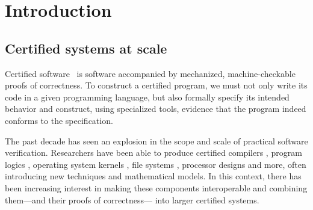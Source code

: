 \documentclass[draft,11pt]{report}
\begin{document}
\begin{abstract}



\end{abstract}

\tableofcontents

\chapter{Introduction} %

\section{Certified systems at scale} %
\label{ssec:certsys}


Certified software~\citep{shao10}
is software accompanied by
mechanized, machine-checkable proofs of correctness.
To construct a certified program,
we must not only write its code in a given programming language,
but also formally specify its intended behavior
and construct, using specialized tools,
evidence that the program
indeed conforms to the specification.


The past decade has seen an explosion
in the scope and scale of practical software verification.
Researchers have been able to produce certified
compilers \citep{compcert},
program logics \citep{vst},
operating system kernels \citep{sel4,popl15},
file systems \citep{fscq},
processor designs \citep{safe,kami} and more,
often introducing new techniques
and mathematical models.
In this context,
there has been increasing interest in
making these components
interoperable and
combining them---and their proofs of correctness---%
into larger certified systems.
\end{document}
